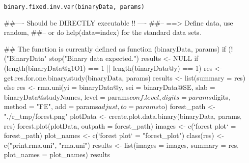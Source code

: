 \begin{Usage}
\begin{verbatim}
binary.fixed.inv.var(binaryData, params)
\end{verbatim}
\end{Usage}
\begin{Arguments}
\begin{ldescription}
\item[\code{binaryData}] 
\item[\code{params}] 
\end{ldescription}
\end{Arguments}
\begin{Examples}
\begin{ExampleCode}
##---- Should be DIRECTLY executable !! ----
##-- ==>  Define data, use random,
##--    or do  help(data=index)  for the standard data sets.

## The function is currently defined as
function (binaryData, params) 
{
    if (!("BinaryData" %
        stop("Binary data expected.")
    results <- NULL
    if (length(binaryData@g1O1) == 1 || length(binaryData@y) == 
        1) {
        res <- get.res.for.one.binary.study(binaryData, params)
        results <- list(summary = res)
    }
    else {
        res <- rma.uni(yi = binaryData@y, sei = binaryData@SE, 
            slab = binaryData@studyNames, level = params$conf.level, 
            digits = params$digits, method = "FE", add = params$adjust, 
            to = params$to)
        forest_path <- "./r_tmp/forest.png"
        plotData <- create.plot.data.binary(binaryData, params, 
            res)
        forest.plot(plotData, outpath = forest_path)
        images <- c(`forest plot` = forest_path)
        plot_names <- c(`forest plot` = "forest_plot")
        class(res) <- c("print.rma.uni", "rma.uni")
        results <- list(images = images, summary = res, plot_names = plot_names)
    }
    results
  }
\end{ExampleCode}
\end{Examples}

